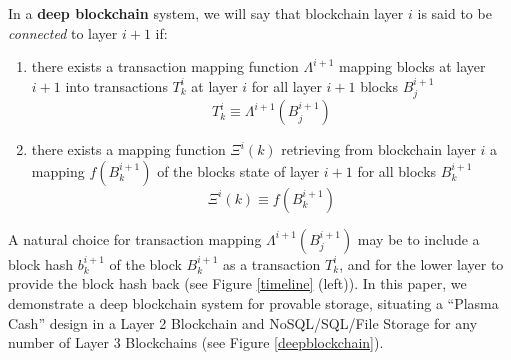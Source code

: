 \documentclass{article}
\newcommand{\block}[2]{B^{#1}_{#2}}
\newcommand{\blockhash}[2]{b^{#1}_{#2}}
\newcommand{\submission}[1]{\Lambda^{#1}}
\newcommand{\transaction}[2]{T_{#2}^#1}
\newcommand{\retrieval}[1]{\Xi^{#1}}
\begin{document}
In a {\bf deep blockchain} system, we will say that blockchain layer $i$ is said to be {\em connected} to layer $i+1$ if:
\begin{enumerate}
    \item there exists a transaction mapping function $\submission{i+1}$ mapping blocks at layer $i+1$ into transactions $\transaction{i}{k}$ at layer $i$ for all layer $i+1$ blocks $\block{i+1}{j}$
\begin{equation}
\transaction{i}{k} \equiv \submission{i+1}(\block{i+1}{j})
\end{equation}
    \item there exists a mapping function $\retrieval{i}(k)$ retrieving from blockchain layer $i$ a mapping  $f(\block{i+1}{k})$ of the blocks state of layer $i+1$  for all blocks $\block{i+1}{k}$
\begin{equation}
\retrieval{i}(k) \equiv f(\block{i+1}{k})
\end{equation}
\end{enumerate}
A natural choice for transaction mapping $\submission{i+1}(\block{i+1}{j})$ may be to include a block hash $\blockhash{i+1}{k}$ of the block $\block{i+1}{k}$ as a transaction $\transaction{i}{k}$, and for the lower layer to provide the block hash back (see Figure \ref{timeline} (left)).  In this paper, we demonstrate a deep blockchain system for provable storage, situating a ``Plasma Cash'' design \cite{plasmacashsimplespec} in a Layer 2 Blockchain and NoSQL/SQL/File Storage for any number of Layer 3 Blockchains (see Figure \ref{deepblockchain}).
\end{document}

